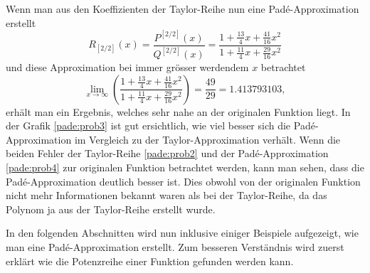 Wenn man aus den Koeffizienten der Taylor-Reihe nun eine Padé-Approximation erstellt 
\begin{equation*}
R_{[2/ 2]}(x)
=
\frac{P^{[2/2]}(x)}{Q^{[2/2]}(x)}
=
\frac{1+\frac{13}{4}x+\frac{41}{16}x^2}{1 + \frac{11}{4}x + \frac{29}{16}x^2} 
\label{pade:bspordnung2}
\end{equation*}
und diese Approximation bei immer grösser werdendem $x$ betrachtet
\begin{equation*}
\lim_{x \to \infty}
\left(
\frac{1+\frac{13}{4}x+\frac{41}{16}x^2}{1 + \frac{11}{4}x + \frac{29}{16}x^2} 
\right)
=
\frac{49}{29} = 1.413793103,
\end{equation*}
erhält man ein Ergebnis, welches sehr nahe an der originalen Funktion liegt. 
In der Grafik \ref{pade:prob3} ist gut ersichtlich, wie viel besser sich die Padé-Approximation im Vergleich zu der Taylor-Approximation verhält.
Wenn die beiden Fehler der Taylor-Reihe \ref{pade:prob2} und der Padé-Approximation \ref{pade:prob4} zur originalen Funktion betrachtet werden, kann man sehen, dass die Padé-Approximation deutlich besser ist.
Dies obwohl von der originalen Funktion nicht mehr Informationen bekannt waren als bei der Taylor-Reihe, da das Polynom ja aus der Taylor-Reihe erstellt wurde.

In den folgenden Abschnitten wird nun inklusive einiger Beispiele aufgezeigt, wie man eine Padé-Approximation erstellt.
Zum besseren Verständnis wird zuerst erklärt wie die Potenzreihe einer Funktion gefunden werden kann.










